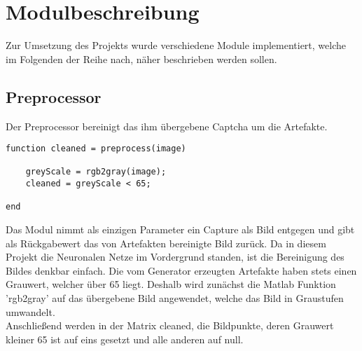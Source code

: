 \section{Modulbeschreibung}
Zur Umsetzung des Projekts wurde verschiedene Module implementiert, welche im Folgenden der Reihe nach, näher beschrieben werden sollen.
\subsection{Preprocessor}
Der Preprocessor bereinigt das ihm übergebene Captcha um die Artefakte.
\begin{lstlisting}
function cleaned = preprocess(image)

	greyScale = rgb2gray(image);
	cleaned = greyScale < 65;

end
\end{lstlisting}
Das Modul nimmt als einzigen Parameter ein Capture als Bild entgegen und gibt als Rückgabewert das von Artefakten bereinigte Bild zurück. Da in diesem Projekt die Neuronalen Netze im Vordergrund standen, ist die Bereinigung des Bildes denkbar einfach. Die vom Generator erzeugten Artefakte haben stets einen Grauwert, welcher über 65 liegt. Deshalb wird zunächst die Matlab Funktion 'rgb2gray' auf das übergebene Bild angewendet, welche das Bild in Graustufen umwandelt.\\
Anschließend werden in der Matrix cleaned, die Bildpunkte, deren Grauwert kleiner 65 ist auf eins gesetzt und alle anderen auf null.
\newpage
